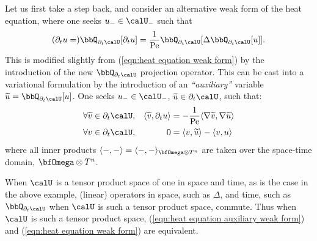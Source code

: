     Let us first take a step back, and consider an alternative weak form of the heat equation, where one seeks $u_{-}  \in  \calU_{-}$ such that
    \begin{equation}\label{eqn:heat equation auxiliary weak form}
        (\partial_{t}u  =)  \bbQ_{\partial_{t}\calU}[\partial_{t}u]  =  \frac{1}{\rmPe}\bbQ_{\partial_{t}\calU}[\Delta\bbQ_{\partial_{t}\calU}[u]].
    \end{equation}
    This is modified slightly from (\ref{eqn:heat equation weak form}) by the introduction of the new $\bbQ_{\partial_{t}\calU}$ projection operator. This can be cast into a variational formulation by the introduction of an \emph{``auxiliary''} variable $\widetilde{u}  =  \bbQ_{\partial_{t}\calU}[u]$. One seeks $u_{-}  \in  \calU_{-}$, $\widetilde{u}  \in  \partial_{t}\calU$, such that:
    \begin{align}
        &\forall  \widetilde{v}  \in  \partial_{t}\calU,  &  \langle\widetilde{v}, \partial_{t}u\rangle  &=  - \frac{1}{\rmPe}\langle\nabla\widetilde{v}, \nabla\widetilde{u}\rangle  \label{eqn:heat equation auxiliary variational form 1}  \\
        &\forall              v  \in  \partial_{t}\calU,  &                                0  &=  \langle v, \widetilde{u}\rangle - \langle v, u\rangle  \label{eqn:heat equation auxiliary variational form 2}
    \end{align}
    where all inner products $\langle -, -\rangle  =  \langle -, -\rangle_{\bfOmega\otimes T^{n}}$ are taken over the space-time domain, $\bfOmega\otimes T^{n}$.
    
    When $\calU$ is a tensor product space of one in space and time, as is the case in the above example, (linear) operators in space, such as $\Delta$, and time, such as $\bbQ_{\partial_{t}\calU}$ when $\calU$ is such a tensor product space, commute. Thus when $\calU$ is such a tensor product space, (\ref{eqn:heat equation auxiliary weak form}) and (\ref{eqn:heat equation weak form}) are equivalent.

